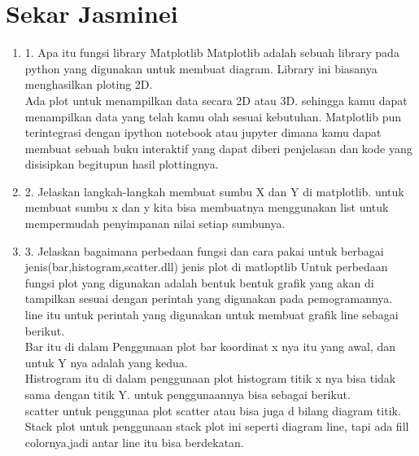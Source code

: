 \section{Sekar Jasminei}
\begin{enumerate}

\item 1. Apa itu fungsi library Matplotlib
Matplotlib adalah sebuah library pada python yang digunakan untuk membuat diagram. Library ini biasanya menghasilkan ploting 2D.\\

Ada plot untuk menampilkan data secara 2D atau 3D. sehingga kamu dapat menampilkan data yang telah kamu olah sesuai kebutuhan. Matplotlib pun terintegrasi dengan ipython notebook atau jupyter dimana kamu dapat membuat sebuah buku interaktif yang dapat diberi penjelasan dan kode yang disisipkan begitupun hasil plottingnya.\\

\item 2. Jelaskan langkah-langkah membuat sumbu X dan Y di matplotlib.
untuk membuat sumbu x dan y kita bisa membuatnya menggunakan list untuk mempermudah penyimpanan nilai setiap sumbunya.\\


\item 3. Jelaskan bagaimana perbedaan fungsi dan cara pakai untuk berbagai jenis(bar,histogram,scatter.dll) jenis plot di matloptlib
Untuk perbedaan fungsi plot yang digunakan adalah bentuk bentuk grafik yang akan di tampilkan sesuai dengan perintah yang digunakan pada pemogramannya.\\

line itu untuk perintah yang digunakan untuk membuat grafik line sebagai berikut.\\

Bar itu di dalam Penggunaan plot bar koordinat x nya itu yang awal, dan untuk Y nya adalah yang kedua.\\

Histrogram itu di dalam penggunaan plot histogram titik x nya bisa tidak sama dengan titik Y. untuk penggunaannya bisa sebagai berikut.\\

scatter untuk penggunaa plot scatter atau bisa juga d bilang diagram titik.\\

Stack plot untuk penggunaan stack plot ini seperti diagram line, tapi ada fill colornya,jadi antar line itu bisa berdekatan.\\



\end{enumerate}

